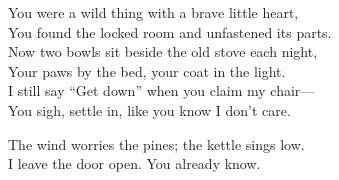 \begin{lyrics}
You were a wild thing with a brave little heart,\\
You found the locked room and unfastened its parts.\\
Now two bowls sit beside the old stove each night,\\
Your paws by the bed, your coat in the light.\\
I still say “Get down” when you claim my chair—\\
You sigh, settle in, like you know I don’t care.

The wind worries the pines; the kettle sings low.\\
I leave the door open. You already know.
\end{lyrics}

